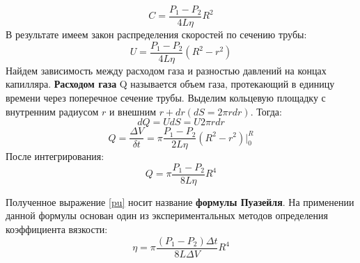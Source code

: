 \documentclass[a4paper,12pt]{article}
\begin{document}
$$C = \frac{P_1 - P_2}{4L\eta}R^2$$
В результате имеем закон распределения скоростей по сечению трубы:
\begin{equation}\label{distrib}
U = \frac{P_1 - P_2}{4L\eta}(R^2-r^2)
\end{equation}
Найдем зависимость между расходом газа и разностью давлений на
концах капилляра. \textbf{Расходом газа} Q называется объем газа, протекающий в единицу времени через поперечное сечение трубы.
Выделим кольцевую площадку с внутренним радиусом $r$ и внешним $r + dr (dS = 2\pi rdr)$. Тогда:
$$dQ = UdS = U2\pi rdr$$
$$Q = \frac{\Delta V}{\delta t} = \pi\frac{P_1 - P_2}{2L\eta}(R^2-r^2)\bigg|_0^R$$
\vspace{0.2cm}
После интегрирования:
\begin{equation}\label{pu}
Q = \pi\frac{P_1 - P_2}{8L\eta}R^4
\end{equation}

Полученное выражение \eqref{pu} носит название \textbf{формулы Пуазейля}. На применении данной формулы основан один из экспериментальных методов определения коэффициента вязкости:
\begin{equation}
\eta = \pi\frac{(P_1-P_2)\Delta t}{8L\Delta V}R^4
\end{equation}
\end{document}
